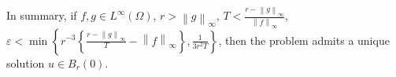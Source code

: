 \documentclass[letterpaper,twoside,11pt]{article}
\theoremstyle{mystyle}
\newcommand{\cbk}{\color{black}}
\begin{document}
In summary, if $f, g \in L^{\infty}(\Omega)$, $r > {\left\| g \right\|_\infty }$, $T < \frac{{r - {{\left\| g \right\|}_\infty }}}{{{{\left\| f \right\|}_\infty }}}$, $\varepsilon  < \min \left\{ {{r^{ - 3}}\left\{ {\frac{{r - {{\left\| g \right\|}_\infty }}}{T} - {{\left\| f \right\|}_\infty }} \right\},\frac{1}{{3{r^2}T}}} \right\}$, then the problem admits a unique solution $u \in B_r(0)$. 



\cbk 
\end{document}
